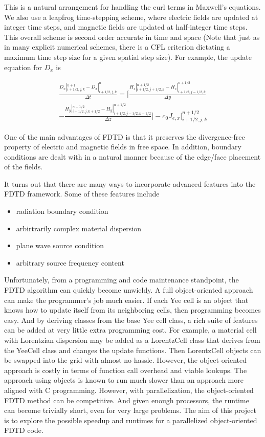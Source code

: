 \documentclass{article}
\begin{document}
This is a natural arrangement for handling the curl terms in Maxwell's equations. We also use a leapfrog time-stepping scheme, where electric fields are updated at integer time steps, and magnetic fields are updated at half-integer time steps. This overall scheme is second order accurate in time and space (Note that just as in many explicit numerical schemes, there is a CFL criterion dictating a maximum time step size for a given spatial step size). For example, the update equation for $D_x$ is 

\begin{multline*} 
\frac{{D}_x|_{i+1/2,j,k}^{n+1} - {D}_x|_{i+1/2,j,k}^{n}}{\Delta t} = [\frac{{H}_z|_{i+1/2,j+1/2,k}^{n+1/2} - {H}_z|_{i+1/2,j-1/2,k}^{n+1/2}}{\Delta y} \\
- \frac{{H}_y|_{i+1/2,j,k+1/2}^{n+1/2} - {H}_y|_{i+1/2,j-1/2,k-1/2}^{n+1/2}}{\Delta z}] - c_0J_{e,x}|_{i+1/2,j,k}^{n+1/2}
\end{multline*} 




One of the main advantages of FDTD is that it preserves the divergence-free property of electric and magnetic fields in free space. In addition, boundary conditions are dealt with in a natural manner because of the edge/face placement of the fields. 

It turns out that there are many ways to incorporate advanced features into the FDTD framework. Some of these features include

\begin{itemize}
	\item radiation boundary condition
	\item arbirtrarily complex material dispersion
	\item plane wave source condition
	\item arbitrary source frequency content
\end{itemize}

Unfortunately, from a programming and code maintenance standpoint, the FDTD algorithm can quickly become unwieldy. A full object-oriented approach can make the programmer's job much easier. If each Yee cell is an object that knows how to update itself from its neighboring cells, then programming becomes easy. And by deriving classes from the base Yee cell class, a rich suite of features can be added at very little extra programming cost. For example, a material cell with Lorentzian dispersion may be added as a LorentzCell class that derives from the YeeCell class and changes the update functions. Then LorentzCell objects can be swapped into the grid with almost no hassle. However, the object-oriented approach is costly in terms of function call overhead and vtable lookups.  The approach using objects is known to run much slower than an approach more aligned with C programming. However, with parallelization, the object-oriented FDTD method can be competitive. And given enough processors, the runtime can become trivially short, even for very large problems. The aim of this project is to explore the possible speedup and runtimes for a parallelized object-oriented FDTD code. 
\end{document}
